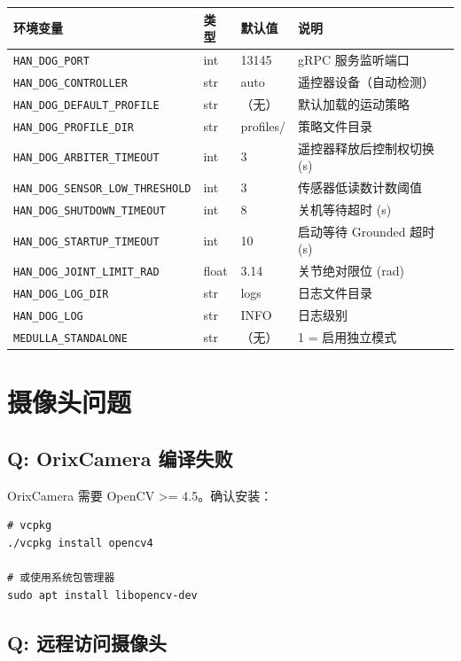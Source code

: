 \documentclass[a4paper,11pt,openany]{book}
\begin{document}
{\small
\begin{longtable}{llll}
\toprule
环境变量 & 类型 & 默认值 & 说明 \\
\midrule
\endhead
\texttt{HAN\_DOG\_PORT} & int & 13145 & gRPC 服务监听端口 \\
\texttt{HAN\_DOG\_CONTROLLER} & str & auto & 遥控器设备（自动检测）\\
\texttt{HAN\_DOG\_DEFAULT\_PROFILE} & str & （无）& 默认加载的运动策略 \\
\texttt{HAN\_DOG\_PROFILE\_DIR} & str & profiles/ & 策略文件目录 \\
\texttt{HAN\_DOG\_ARBITER\_TIMEOUT} & int & 3 & 遥控器释放后控制权切换 (s) \\
\texttt{HAN\_DOG\_SENSOR\_LOW\_THRESHOLD} & int & 3 & 传感器低读数计数阈值 \\
\texttt{HAN\_DOG\_SHUTDOWN\_TIMEOUT} & int & 8 & 关机等待超时 (s) \\
\texttt{HAN\_DOG\_STARTUP\_TIMEOUT} & int & 10 & 启动等待 Grounded 超时 (s) \\
\texttt{HAN\_DOG\_JOINT\_LIMIT\_RAD} & float & 3.14 & 关节绝对限位 (rad) \\
\texttt{HAN\_DOG\_LOG\_DIR} & str & logs & 日志文件目录 \\
\texttt{HAN\_DOG\_LOG} & str & INFO & 日志级别 \\
\texttt{MEDULLA\_STANDALONE} & str & （无）& 1 = 启用独立模式 \\
\bottomrule
\end{longtable}
}

\section{摄像头问题}

\subsection{Q: OrixCamera 编译失败}

OrixCamera 需要 OpenCV >= 4.5。确认安装：

\begin{lstlisting}[style=bash]
# vcpkg
./vcpkg install opencv4

# 或使用系统包管理器
sudo apt install libopencv-dev
\end{lstlisting}

\subsection{Q: 远程访问摄像头}
\end{document}
